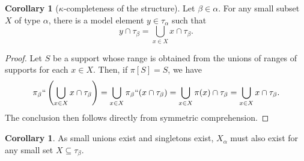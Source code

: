 \documentclass{article}
\theoremstyle{definition}
\newtheorem{corollary}[theorem]{Corollary}
\theoremstyle{remark}
\newtheorem{remark}[theorem]{Remark}
\begin{document}
{\begin{corollary}[$\kappa$-completeness of the structure]
Let $\beta \in \alpha$.
For any small subset $X$ of type $\alpha$, there is a model element $y \in \tau_\alpha$ such that $$y \cap \tau_\beta = \bigcup_{x \in X} x \cap \tau_\beta.$$
\end{corollary}
\begin{proof}
Let $S$ be a support whose range is obtained from the unions of ranges of supports for each $x \in X$.
Then, if $\pi[S] = S$, we have
$$\pi_\beta``\left(\bigcup_{x \in X} x \cap \tau_\beta\right) = \bigcup_{x \in X} \pi_\beta``(x \cap \tau_\beta) = \bigcup_{x \in X} \pi(x) \cap \tau_\beta = \bigcup_{x \in X} x \cap \tau_\beta.$$
The conclusion then follows directly from symmetric comprehension.
\end{proof}

\begin{corollary}
As small unions exist and singletons exist, $X_\alpha$ must also exist for any small set $X \subseteq \tau_\beta$.
\end{corollary}
}

\begin{comment}
\begin{remark}[$\kappa$-completeness of the structure]
For any subset $X$ with cardinality $<\kappa$ of a type $\gamma$ and $\beta>\gamma$, it should be clear that $X_\beta$ has a support, whose range is obtained from the union of the ranges of the supports of the elements of $X$  by replacing each element $(u,B)$ of the union of the ranges  with $(u,B \cup \{\beta\})$, and therefore belongs to the model.  $X_\beta$ is obviously extensional (the extension $X$ is clearly the distinguished extension and has no image under $A^{-1}$).
\end{remark}
\end{comment}
\end{document}
